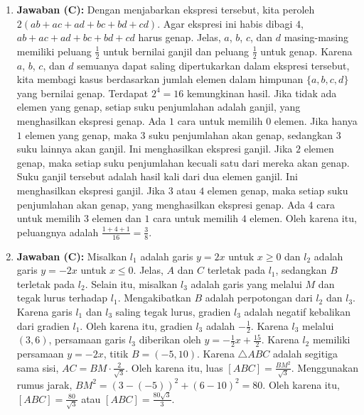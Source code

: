 \documentclass{article}
\begin{document}
\begin{enumerate}
\item \textbf{Jawaban (C):} Dengan menjabarkan ekspresi tersebut, kita peroleh $2(ab+ac+ad+bc+bd+cd)$. Agar ekspresi ini habis dibagi $4$, $ab+ac+ad+bc+bd+cd$ harus genap. Jelas, $a$, $b$, $c$, dan $d$ masing-masing memiliki peluang $\frac{1}{2}$ untuk bernilai ganjil dan peluang $\frac{1}{2}$ untuk genap. Karena $a$, $b$, $c$, dan $d$ semuanya dapat saling dipertukarkan dalam ekspresi tersebut, kita membagi kasus berdasarkan jumlah elemen dalam himpunan $\{a, b, c, d\}$ yang bernilai genap. Terdapat $2^{4}=16$ kemungkinan hasil. Jika tidak ada elemen yang genap, setiap suku penjumlahan adalah ganjil, yang menghasilkan ekspresi genap. Ada $1$ cara untuk memilih $0$ elemen. Jika hanya $1$ elemen yang genap, maka $3$ suku penjumlahan akan genap, sedangkan $3$ suku lainnya akan ganjil. Ini menghasilkan ekspresi ganjil. Jika $2$ elemen genap, maka setiap suku penjumlahan kecuali satu dari mereka akan genap. Suku ganjil tersebut adalah hasil kali dari dua elemen ganjil. Ini menghasilkan ekspresi ganjil. Jika $3$ atau $4$ elemen genap, maka setiap suku penjumlahan akan genap, yang menghasilkan ekspresi genap. Ada $4$ cara untuk memilih $3$ elemen dan $1$ cara untuk memilih $4$ elemen. Oleh karena itu, peluangnya adalah $\frac{1+4+1}{16}=\frac{3}{8}$.

\item \textbf{Jawaban (C):} Misalkan $l_{1}$ adalah garis $y=2x$ untuk $x\ge0$ dan $l_{2}$ adalah garis $y=-2x$ untuk $x\le0$. Jelas, $A$ dan $C$ terletak pada $l_{1}$, sedangkan $B$ terletak pada $l_{2}$. Selain itu, misalkan $l_{3}$ adalah garis yang melalui $M$ dan tegak lurus terhadap $l_{1}$. Mengakibatkan $B$ adalah perpotongan dari $l_{2}$ dan $l_{3}$. Karena garis $l_{1}$ dan $l_{3}$ saling tegak lurus, gradien $l_{3}$ adalah negatif kebalikan dari gradien $l_{1}$. Oleh karena itu, gradien $l_{3}$ adalah $-\frac{1}{2}$. Karena $l_{3}$ melalui $(3,6)$, persamaan garis $l_{3}$ diberikan oleh $y=-\frac{1}{2}x+\frac{15}{2}$. Karena $l_{2}$ memiliki persamaan $y=-2x$, titik $B=(-5,10)$. Karena $\triangle ABC$ adalah segitiga sama sisi, $AC=BM\cdot\frac{2}{\sqrt{3}}$. Oleh karena itu, luas $[ABC]=\frac{BM^{2}}{\sqrt{3}}$. Menggunakan rumus jarak, $BM^{2}=(3-(-5))^{2}+(6-10)^{2}=80$. Oleh karena itu, $[ABC]=\frac{80}{\sqrt{3}}$ atau $[ABC]=\frac{80\sqrt{3}}{3}$.


\end{enumerate}
\end{document}
